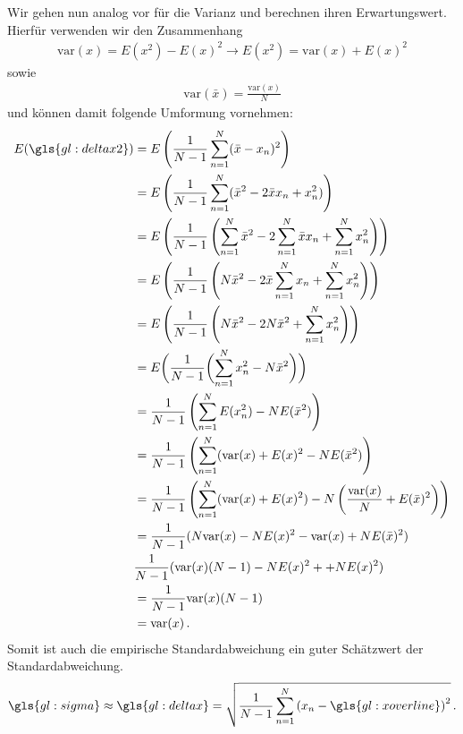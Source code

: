 Wir gehen nun analog vor für die Varianz und berechnen ihren Erwartungswert. Hierfür verwenden wir den Zusammenhang
\begin{align}
\text{var}(x) = E(x^2) - E(x)^2 \rightarrow E(x^2) = \text{var}(x) + E(x)^2
\end{align}
sowie
\begin{align}
\text{var}(\bar{x}) = \frac{\text{var}(x)}{N} 
\end{align}
und können damit folgende Umformung vornehmen: 
\begin{align}
\begin{split}
E(\gls{gl:deltax2}) &= E \left( \frac{1}{N-1} \sum_{n=1}^N ( \bar{x} - x_n )^2 \right)\\
&= E \left( \frac{1}{N-1} \sum_{n=1}^N ( \bar{x}^2 - 2 \bar{x} x_n + x_n^2 ) \right)\\
&= E \left( \frac{1}{N-1} \left( \sum_{n=1}^N \bar{x}^2 - 2 \sum_{n=1}^N \bar{x} x_n + \sum_{n=1}^N x_n^2 \right) \right)\\
&= E \left( \frac{1}{N-1} \left( N \bar{x}^2 - 2 \bar{x} \sum_{n=1}^N x_n + \sum_{n=1}^N x_n^2 \right) \right)\\
& = E \left( \frac{1}{N-1} \left( N \bar{x}^2 - 2 N \bar{x}^2 + \sum_{n=1}^N x_n^2 \right) \right)\\
&= E \biggl( \frac{1}{N-1} \biggl( \sum_{n=1}^N x_n^2 - N \bar{x}^2 \biggr) \biggr)\\
&= \frac{1}{N-1} \left( \sum_{n=1}^N E(x_n^2) - N E(\bar{x}^2) \right)\\
& = \frac{1}{N-1} \left( \sum_{n=1}^N (\text{var}(x) + E(x)^2 - N E(\bar{x}^2) \right)\\
& = \frac{1}{N-1} \left( \sum_{n=1}^N (\text{var}(x) + E(x)^2) - N \left( \frac{\text{var}(x)}{N} + E(\bar{x})^2 \right) \right)\\
&= \frac{1}{N-1} ( N \text{var}(x) - N E(x)^2 - \text{var}(x) + N E(\bar{x})^2 )\\
& \frac{1}{N-1} (\text{var}(x) (N-1) - N E(x)^2 + + N E(x)^2 ) \\
&= \frac{1}{N-1} \text{var}(x) (N-1) \\
&= \text{var}(x)\,.
\end{split}
\end{align}
Somit ist auch die empirische Standardabweichung ein guter Schätzwert der Standardabweichung.
\begin{align}
\gls{gl:sigma} \approx \gls{gl:deltax} = \sqrt{\frac{1}{N-1} \sum^N_{n = 1} \left( x_n - \gls{gl:xoverline} \right)^2}\,.
\end{align}

